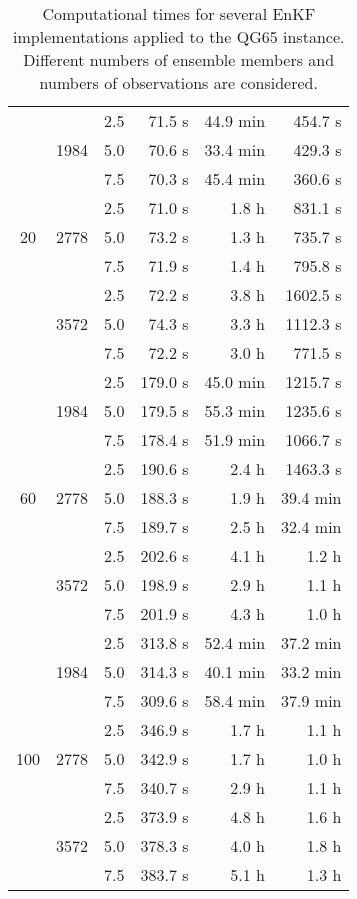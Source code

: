 \documentclass[12pt]{article}
\begin{document}
\begin{table}[H]
\centering
{\footnotesize
\begin{tabular}{|c|c|c|r|r|r|} \hline
 &  &  &  &  &  \\ \hline
\multirow{9}{*}{20} &  \multirow{3}{*}{1984}  & 2.5 & 71.5 s &  44.9 min & 454.7 s\\
& & 5.0 & 70.6 s &  33.4 min & 429.3 s \\ 
& & 7.5 & 70.3 s &  45.4 min & 360.6 s\\ 
\cline{2-6}
&  \multirow{3}{*}{2778}  & 2.5 & 71.0 s & 1.8 h & 831.1 s\\
& & 5.0 & 73.2 s &  1.3 h & 735.7 s \\ 
& & 7.5 & 71.9 s &  1.4 h & 795.8 s \\ 
\cline{2-6}
&  \multirow{3}{*}{3572}  & 2.5 & 72.2 s & 3.8 h & 1602.5 s \\
& & 5.0 & 74.3 s &  3.3 h & 1112.3 s \\ 
& & 7.5 & 72.2 s &  3.0 h & 771.5 s \\ 
\cline{1-6}
\multirow{9}{*}{60} &  \multirow{3}{*}{1984}  & 2.5 & 179.0 s &  45.0 min & 1215.7 s \\
& & 5.0 & 179.5 s & 55.3 min & 1235.6 s \\ 
& & 7.5 & 178.4 s & 51.9 min & 1066.7 s \\ 
\cline{2-6}
&  \multirow{3}{*}{2778}  & 2.5 & 190.6 s &  2.4 h & 1463.3 s \\
& & 5.0 & 188.3 s & 1.9 h &   39.4 min\\ 
& & 7.5 & 189.7 s & 2.5 h &  32.4 min \\ 
\cline{2-6}
&  \multirow{3}{*}{3572}  & 2.5 & 202.6 s &  4.1 h & 1.2 h \\
& & 5.0 & 198.9 s & 2.9 h & 1.1 h  \\ 
& & 7.5 & 201.9 s &  4.3 h & 1.0 h  \\ 
\cline{1-6}
\multirow{9}{*}{100} &  \multirow{3}{*}{1984}  & 2.5 & 313.8 s & 52.4 min  & 37.2 min \\
& & 5.0 & 314.3 s & 40.1 min & 33.2 min \\ 
& & 7.5 & 309.6 s &  58.4 min  & 37.9 min  \\ 
\cline{2-6}
&  \multirow{3}{*}{2778}  & 2.5 & 346.9 s & 1.7 h &  1.1 h \\
& & 5.0 & 342.9 s &  1.7 h & 1.0 h  \\ 
& & 7.5 & 340.7 s &  2.9 h &  1.1 h  \\ 
\cline{2-6}
&  \multirow{3}{*}{3572}  & 2.5 & 373.9 s & 4.8 h & 1.6 h \\
& & 5.0 & 378.3 s & 4.0 h & 1.8 h \\ 
& & 7.5 & 383.7 s & 5.1 h  & 1.3 h \\ 
\hline
\end{tabular}
}
\caption{Computational times for several EnKF implementations applied to the QG65 instance.
Different numbers of ensemble members and numbers of observations are considered.}
\label{Tab:QG65-Results-ElapsedTime}
\end{table}
\end{document}

